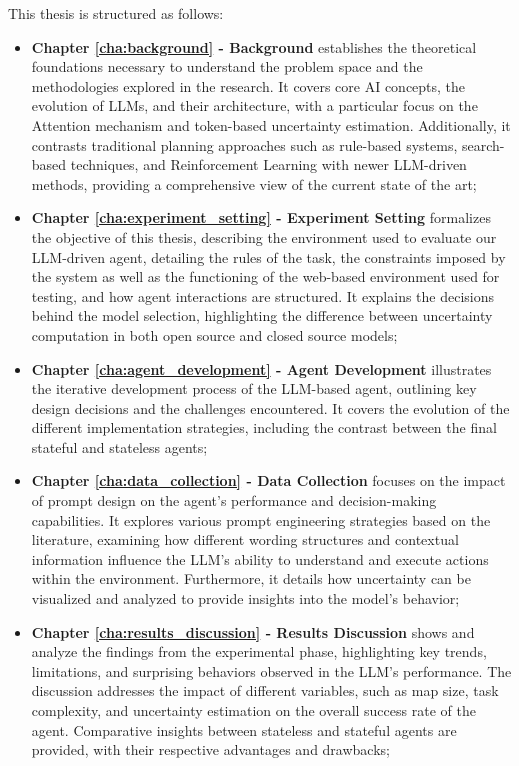 This thesis is structured as follows:
\begin{itemize}
  \item \textbf{Chapter \ref{cha:background} - Background} establishes the
    theoretical foundations necessary to understand the problem space and the
    methodologies explored in the research. It covers core AI concepts, the
    evolution of LLMs, and their architecture, with a particular focus on the
    Attention mechanism and token-based uncertainty estimation. Additionally, it
    contrasts traditional planning approaches such as rule-based systems, search-based
    techniques, and Reinforcement Learning with newer LLM-driven methods, providing
    a comprehensive view of the current state of the art;

  \item \textbf{Chapter \ref{cha:experiment_setting} - Experiment Setting}
    formalizes the objective of this thesis, describing the environment used to evaluate
    our LLM-driven agent, detailing the rules of the task, the constraints imposed
    by the system as well as the functioning of the web-based environment used for
    testing, and how agent interactions are structured. It explains the decisions
    behind the model selection, highlighting the difference between uncertainty
    computation in both open source and closed source models;

  \item \textbf{Chapter \ref{cha:agent_development} - Agent Development}
    illustrates the iterative development process of the LLM-based agent, outlining
    key design decisions and the challenges encountered. It covers the evolution
    of the different implementation strategies, including the contrast between the
    final stateful and stateless agents;

  \item \textbf{Chapter \ref{cha:data_collection} - Data Collection} focuses on
    the impact of prompt design on the agent's performance and decision-making
    capabilities. It explores various prompt engineering strategies based on the
    literature, examining how different wording structures and contextual
    information influence the LLM's ability to understand and execute actions
    within the environment. Furthermore, it details how uncertainty can be
    visualized and analyzed to provide insights into the model's behavior;

  \item \textbf{Chapter \ref{cha:results_discussion} - Results Discussion} shows
    and analyze the findings from the experimental phase, highlighting key trends,
    limitations, and surprising behaviors observed in the LLM's performance. The
    discussion addresses the impact of different variables, such as map size,
    task complexity, and uncertainty estimation on the overall success rate of the
    agent. Comparative insights between stateless and stateful agents are
    provided, with their respective advantages and drawbacks;


\end{itemize}

